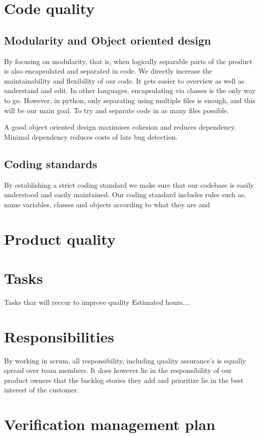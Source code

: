 \documentclass{article}
\begin{document}
\section{Code quality}

\subsection{Modularity and Object oriented design}
By focusing on modularity, that is, when logically separable parts of the product is also encapsulated and separated in code. We directly increase the maintainability and flexibility of our code. It gets easier to overview as well as understand and edit. In other languages, encapsulating via classes is the only way to go. However, in python, only separating using multiple files is enough, and this will be our main goal. To try and separate code in as many files possible.

A good object oriented design maximises cohesion and reduces dependency. Minimal dependency reduces costs of late bug detection.

\subsection{Coding standards}
By establishing a strict coding standard we make sure that our codebase is easily understood and easily maintained. Our coding standard includes rules such as, name variables, classes and objects according to what they are and 


\section{Product quality}

\section{Tasks}
Tasks thar will reccur to improve quality
Estimated hours....
\section{Responsibilities}
By working in scrum, all responsibility, including quality assurance's is equally spread over team members. It does however lie in the responsibility of our product owners that the backlog stories they add and prioritize lie in the best interest of the customer.
\section{Verification management plan}
\end{document}
